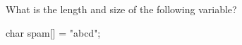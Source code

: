 What is the length and size of the following variable?

\begin{consolethree}[escapeinside=||]

char spam[] = "ab\0cd";

\end{consolethree}

